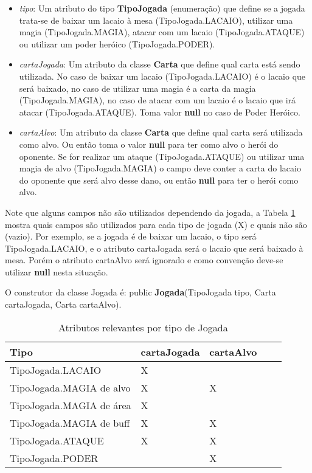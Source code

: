 \documentclass[10pt]{article}
\begin{document}
\begin{itemize}
    \item \textit{tipo}: Um atributo do tipo \textbf{TipoJogada} (enumeração) que define se a jogada trata-se de baixar um lacaio à mesa (TipoJogada.LACAIO), utilizar uma magia (TipoJogada.MAGIA), atacar com um lacaio (TipoJogada.ATAQUE) ou utilizar um poder heróico (TipoJogada.PODER).
    \item \textit{cartaJogada}: Um atributo da classe \textbf{Carta} que define qual carta está sendo utilizada. No caso de baixar um lacaio (TipoJogada.LACAIO) é o lacaio que será baixado, no caso de utilizar uma magia é a carta da magia (TipoJogada.MAGIA), no caso de atacar com um lacaio é o lacaio que irá atacar (TipoJogada.ATAQUE). Toma valor \textbf{null} no caso de Poder Heróico.
    \item \textit{cartaAlvo}: Um atributo da classe \textbf{Carta} que define qual carta será utilizada como alvo. Ou então toma o valor \textbf{null} para ter como alvo o herói do oponente. Se for realizar um ataque (TipoJogada.ATAQUE) ou utilizar uma magia de alvo (TipoJogada.MAGIA) o campo deve conter a carta do lacaio do oponente que será alvo desse dano, ou então \textbf{null} para ter o herói como alvo.
\end{itemize}

Note que alguns campos não são utilizados dependendo da jogada, a Tabela \ref{tab:jogada} mostra quais campos são utilizados para cada tipo de jogada (X) e quais não são (vazio). Por exemplo, se a jogada é de baixar um lacaio, o tipo será TipoJogada.LACAIO, e o atributo cartaJogada será o lacaio que será baixado à mesa. Porém o atributo cartaAlvo será ignorado e como convenção deve-se utilizar \textbf{null} nesta situação.

O construtor da classe Jogada é: public \textbf{Jogada}(TipoJogada tipo, Carta cartaJogada, Carta cartaAlvo).

\renewcommand{\arraystretch}{1.05}
\begin{table}[]
\centering
\caption{Atributos relevantes por tipo de Jogada}
\label{tab:jogada}
\begin{tabular}{|l|l|l|l|l|}
\hline
Tipo & cartaJogada & cartaAlvo \\ \hline
TipoJogada.LACAIO          & X &   \\ \hline
TipoJogada.MAGIA de alvo   & X & X \\ \hline
TipoJogada.MAGIA de área   & X &   \\ \hline
TipoJogada.MAGIA de buff   & X & X \\ \hline
TipoJogada.ATAQUE          & X & X \\ \hline
TipoJogada.PODER           &   & X \\ \hline
\end{tabular}
\end{table}
\end{document}

